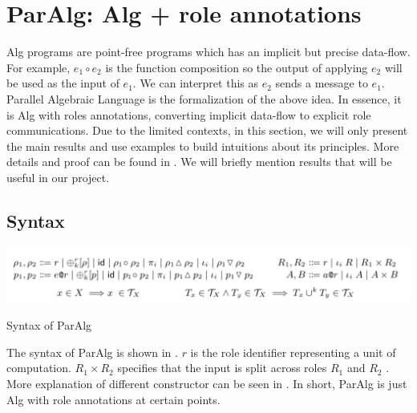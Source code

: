 \section{ParAlg: Alg + role annotations}
Alg programs are point-free programs which has an implicit but precise data-flow. For example, $e_1 \circ e_2$ is the function composition so the output of applying $e_2$ will be used as the input of $e_1$. We can interpret this as $e_2$ sends a message to $e_1$. Parallel Algebraic Language is the formalization of the above idea. In essence, it is Alg with roles annotations, converting implicit data-flow to explicit role communications. Due to the limited contexts, in this section, we will only present the main results and use examples to build intuitions about its principles. More details and proof can be found in \cite{AlgebraicMultipartyProtocol}. We will briefly mention results that will be useful in our project.
\subsection{Syntax}
\begin{table}[ht]
    \centering
    \includegraphics[width=\textwidth]{project/paralg.png}
    \caption{Syntax of ParAlg}
    \label{project:tab:paralg}
\end{table}
The syntax of ParAlg is shown in . $r$ is the role identifier representing a unit of computation. $R_1 \times R_2$ specifies that the input is split across roles $R_1$ and $R_2$ \cite{AlgebraicMultipartyProtocol}. More explanation of different constructor can be seen in \cite{AlgebraicMultipartyProtocol}. In short, ParAlg is just Alg with role annotations at certain points. 

